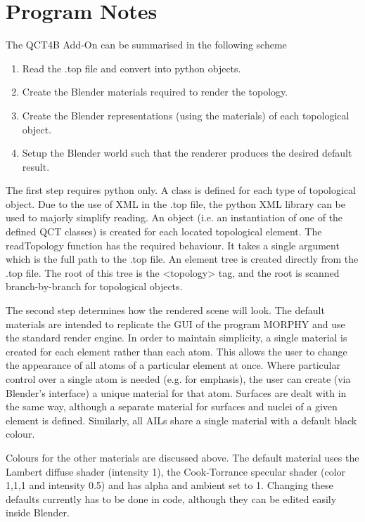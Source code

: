\documentclass{report}
\begin{document}
\chapter{Program Notes}

The QCT4B Add-On can be summarised in the following scheme

\begin{enumerate}

  \item Read the .top file and convert into python objects.
  \item Create the Blender materials required to render the topology.
  \item Create the Blender representations (using the materials) of each topological object.
  \item Setup the Blender world such that the renderer produces the desired default result.

\end{enumerate}

The first step requires python only. A class is defined for each type of topological object.
Due to the use of XML in the .top file, the python XML library can be used to majorly simplify reading.
An object (i.e. an instantiation of one of the defined QCT classes) is created for each located topological element.
The readTopology function has the required behaviour. It takes a single argument which is the full path to the 
.top file.
An element tree is created directly from the .top file. The root of this tree is the <topology> tag, and the 
root is scanned branch-by-branch for topological objects.


The second step determines how the rendered scene will look.
The default materials are intended to replicate the GUI of the program MORPHY and use the standard render engine.
In order to maintain simplicity, a single material is created for each element rather than each atom.
This allows the user to change the appearance of all atoms of a particular element at once.
Where particular control over a single atom is needed (e.g. for emphasis), the user can create 
(via Blender's interface) a unique material for that atom.
Surfaces are dealt with in the same way, although a separate material for surfaces and nuclei of a given 
element is defined.
Similarly, all AILs share a single material with a default black colour.

Colours for the other materials are discussed above. The default material uses the Lambert diffuse shader 
(intensity 1), the Cook-Torrance specular shader (color 1,1,1 and intensity 0.5) and has alpha and ambient set to 1.
Changing these defaults currently has to be done in code, although they can be edited easily inside Blender.
\end{document}
